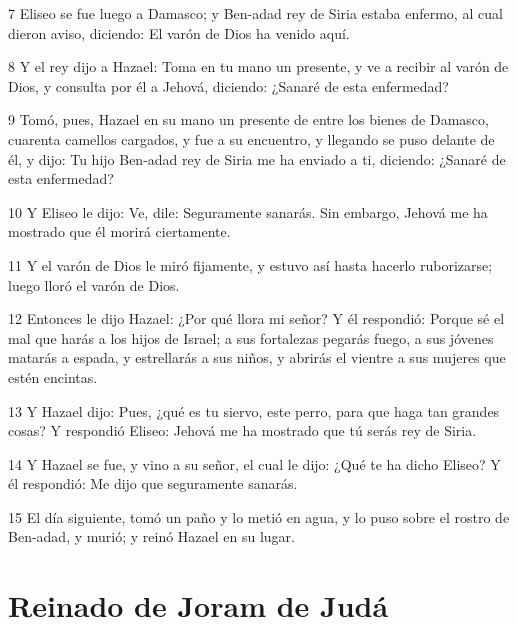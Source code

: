 \par 7 Eliseo se fue luego a Damasco; y Ben-adad rey de Siria estaba enfermo, al cual dieron aviso, diciendo: El varón de Dios ha venido aquí.
\par 8 Y el rey dijo a Hazael: Toma en tu mano un presente, y ve a recibir al varón de Dios, y consulta por él a Jehová, diciendo: ¿Sanaré de esta enfermedad?
\par 9 Tomó, pues, Hazael en su mano un presente de entre los bienes de Damasco, cuarenta camellos cargados, y fue a su encuentro, y llegando se puso delante de él, y dijo: Tu hijo Ben-adad rey de Siria me ha enviado a ti, diciendo: ¿Sanaré de esta enfermedad?
\par 10 Y Eliseo le dijo: Ve, dile: Seguramente sanarás. Sin embargo, Jehová me ha mostrado que él morirá ciertamente.
\par 11 Y el varón de Dios le miró fijamente, y estuvo así hasta hacerlo ruborizarse; luego lloró el varón de Dios.
\par 12 Entonces le dijo Hazael: ¿Por qué llora mi señor? Y él respondió: Porque sé el mal que harás a los hijos de Israel; a sus fortalezas pegarás fuego, a sus jóvenes matarás a espada, y estrellarás a sus niños, y abrirás el vientre a sus mujeres que estén encintas.
\par 13 Y Hazael dijo: Pues, ¿qué es tu siervo, este perro, para que haga tan grandes cosas? Y respondió Eliseo: Jehová me ha mostrado que tú serás rey de Siria. 
\par 14 Y Hazael se fue, y vino a su señor, el cual le dijo: ¿Qué te ha dicho Eliseo? Y él respondió: Me dijo que seguramente sanarás.
\par 15 El día siguiente, tomó un paño y lo metió en agua, y lo puso sobre el rostro de Ben-adad, y murió; y reinó Hazael en su lugar.

\section*{Reinado de Joram de Judá}

